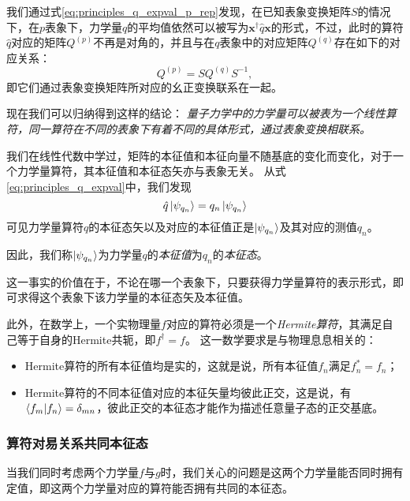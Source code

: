 我们通过式\eqref{eq:principles_q_expval_p_rep}发现，在已知表象变换矩阵$S$的情况下，在$p$表象下，力学量$q$的平均值依然可以被写为$\bm{x}^\dag \hat{q}\bm{x}$的形式，不过，此时的算符$\hat{q}$对应的矩阵$Q^{(p)}$不再是对角的，并且与在$q$表象中的对应矩阵$Q^{(q)}$存在如下的对应关系：
\begin{equation}
    Q^{(p)} = S Q^{(q)} S^{-1},
\end{equation}
即它们通过表象变换矩阵所对应的幺正变换联系在一起。

现在我们可以归纳得到这样的结论：
\emph{量子力学中的力学量可以被表为一个线性算符，同一算符在不同的表象下有着不同的具体形式，通过表象变换相联系。}

我们在线性代数中学过，矩阵的本征值和本征向量不随基底的变化而变化，对于一个力学量算符，其本征值和本征态矢亦与表象无关。
从式\eqref{eq:principles_q_expval}中，我们发现
\begin{equation}
    \hat{q} \ket{\psi_{q_n}} = q_n \ket{\psi_{q_n}}
\end{equation}
可见力学量算符$q$的本征态矢以及对应的本征值正是$\ket{\psi_{q_n}}$及其对应的测值$q_n$。
\begin{tcolorbox}
因此，我们称$\ket{\psi_{q_n}}$为力学量$q$的\emph{本征值}为$q_n$的\emph{本征态}。
\end{tcolorbox}
这一事实的价值在于，不论在哪一个表象下，只要获得力学量算符的表示形式，即可求得这个表象下该力学量的本征态矢及本征值。

此外，在数学上，一个实物理量$f$对应的算符必须是一个\emph{Hermite算符}，其满足自己等于自身的Hermite共轭，即$f^\dag=f$。
这一数学要求是与物理息息相关的：
\begin{itemize}
    \item{Hermite算符的所有本征值均是实的，这就是说，所有本征值$f_n$满足$f_n^*=f_n$；}
    \item{Hermite算符的不同本征值对应的本征矢量均彼此正交，这是说，有$\braket{f_m}{f_n} = \delta_{mn}$，彼此正交的本征态才能作为描述任意量子态的正交基底。}
\end{itemize}


\subsubsection{\texorpdfstring{算符对易关系\quad 共同本征态}{算符对易关系  共同本征态}}

当我们同时考虑两个力学量$f$与$g$时，我们关心的问题是这两个力学量能否同时拥有定值，即这两个力学量对应的算符能否拥有共同的本征态。

